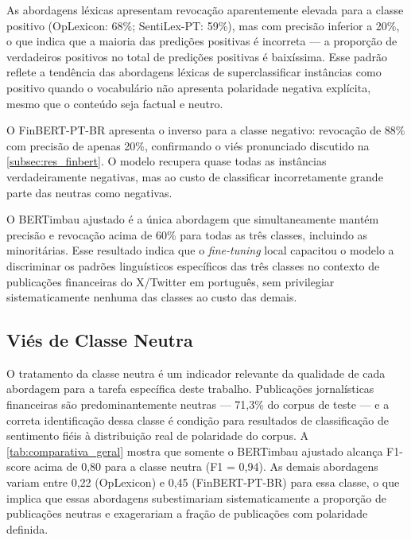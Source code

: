 As abordagens léxicas apresentam revocação aparentemente elevada para a classe positivo (OpLexicon: 68\%; SentiLex-PT: 59\%), mas com precisão inferior a 20\%, o que indica que a maioria das predições positivas é incorreta --- a proporção de verdadeiros positivos no total de predições positivas é baixíssima. Esse padrão reflete a tendência das abordagens léxicas de superclassificar instâncias como positivo quando o vocabulário não apresenta polaridade negativa explícita, mesmo que o conteúdo seja factual e neutro.

O FinBERT-PT-BR apresenta o inverso para a classe negativo: revocação de 88\% com precisão de apenas 20\%, confirmando o viés pronunciado discutido na \autoref{subsec:res_finbert}. O modelo recupera quase todas as instâncias verdadeiramente negativas, mas ao custo de classificar incorretamente grande parte das neutras como negativas.

O BERTimbau ajustado é a única abordagem que simultaneamente mantém precisão e revocação acima de 60\% para todas as três classes, incluindo as minoritárias. Esse resultado indica que o \textit{fine-tuning} local capacitou o modelo a discriminar os padrões linguísticos específicos das três classes no contexto de publicações financeiras do X/Twitter em português, sem privilegiar sistematicamente nenhuma das classes ao custo das demais.


\subsection{Viés de Classe Neutra}
\label{subsec:vies_neutro}

O tratamento da classe neutra é um indicador relevante da qualidade de cada abordagem para a tarefa específica deste trabalho. Publicações jornalísticas financeiras são predominantemente neutras --- 71,3\% do corpus de teste --- e a correta identificação dessa classe é condição para resultados de classificação de sentimento fiéis à distribuição real de polaridade do corpus. A \autoref{tab:comparativa_geral} mostra que somente o BERTimbau ajustado alcança F1-score acima de 0,80 para a classe neutra (F1 = 0,94). As demais abordagens variam entre 0,22 (OpLexicon) e 0,45 (FinBERT-PT-BR) para essa classe, o que implica que essas abordagens subestimariam sistematicamente a proporção de publicações neutras e exagerariam a fração de publicações com polaridade definida.

